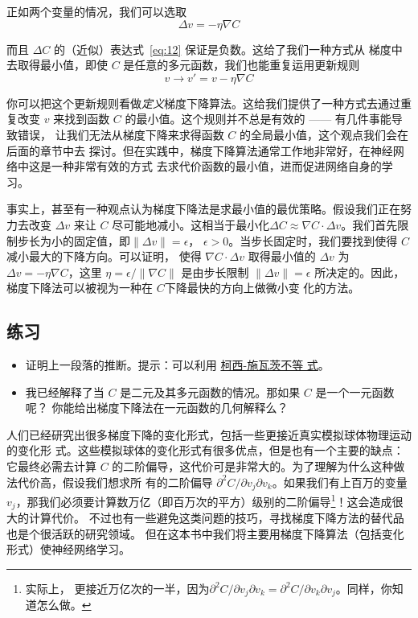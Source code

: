 正如两个变量的情况，我们可以选取
\begin{equation}
  \Delta v = -\eta \nabla C
  \label{eq:14}\tag{14}
\end{equation}

而且 $\Delta C$ 的（近似）表达式~\eqref{eq:12} 保证是负数。这给了我们一种方式从
梯度中去取得最小值，即使 $C$ 是任意的多元函数，我们也能重复运用更新规则
\begin{equation}
  v \rightarrow v' = v-\eta \nabla C
  \label{eq:15}\tag{15}
\end{equation}

你可以把这个更新规则看做\emph{定义}梯度下降算法。这给我们提供了一种方式去通过重
复改变 $v$ 来找到函数 $C$ 的最小值。这个规则并不总是有效的 —— 有几件事能导致错误，
让我们无法从梯度下降来求得函数 $C$ 的全局最小值，这个观点我们会在后面的章节中去
探讨。但在实践中，梯度下降算法通常工作地非常好，在神经网络中这是一种非常有效的方式
去求代价函数的最小值，进而促进网络自身的学习。

事实上，甚至有一种观点认为梯度下降法是求最小值的最优策略。假设我们正在努力去改变
$\Delta v$ 来让 $C$ 尽可能地减小。这相当于最小化$\Delta C \approx \nabla C \cdot
\Delta v$。我们首先限制步长为小的固定值，即$\| \Delta v \| = \epsilon$，
$\epsilon > 0$。当步长固定时，我们要找到使得 $C$ 减小最大的下降方向。可以证明，
使得 $\nabla C \cdot \Delta v$ 取得最小值的 $\Delta v$ 为 $\Delta v = - \eta
\nabla C$，这里 $\eta = \epsilon / \|\nabla C\|$ 是由步长限制 $\|\Delta v\| =
\epsilon$ 所决定的。因此，梯度下降法可以被视为一种在 $C$下降最快的方向上做微小变
化的方法。

\subsection*{练习}

\begin{itemize}
\item 证明上一段落的推断。提示：可以利用
  \href{http://en.wikipedia.org/wiki/Cauchy–Schwarz_inequality}{柯西-施瓦茨不等
    式}。
\item 我已经解释了当 $C$ 是二元及其多元函数的情况。那如果 $C$ 是一个一元函数呢？
  你能给出梯度下降法在一元函数的几何解释么？
\end{itemize}

人们已经研究出很多梯度下降的变化形式，包括一些更接近真实模拟球体物理运动的变化形
式。这些模拟球体的变化形式有很多优点，但是也有一个主要的缺点：它最终必需去计算
$C$ 的二阶偏导，这代价可是非常大的。为了理解为什么这种做法代价高，假设我们想求所
有的二阶偏导 $\partial^2 C/ \partial v_j \partial v_k$。如果我们有上百万的变量
$v_j$，那我们必须要计算数万亿（即百万次的平方）级别的二阶偏导\footnote{实际上，
  更接近万亿次的一半，因为$\partial^2 C/ \partial v_j \partial v_k = \partial^2
  C/ \partial v_k \partial v_j$。同样，你知道怎么做。}！这会造成很大的计算代价。
不过也有一些避免这类问题的技巧，寻找梯度下降方法的替代品也是个很活跃的研究领域。
但在这本书中我们将主要用梯度下降算法（包括变化形式）使神经网络学习。


